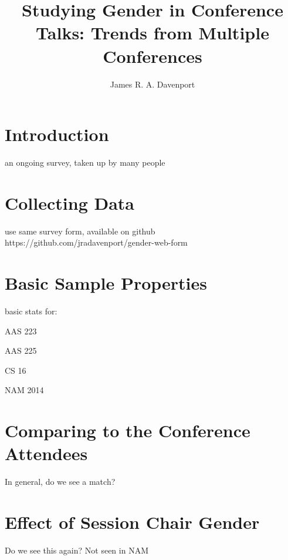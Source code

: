 \documentclass[iop]{emulateapj}
\begin{document}
\title{Studying Gender in Conference Talks: Trends from Multiple Conferences}

\author{
	James R. A. Davenport
	}





\begin{abstract}

\end{abstract}



\section{Introduction}

an ongoing survey, taken up by many people


\section{Collecting Data}

use same survey form, available on github
https://github.com/jradavenport/gender-web-form


\section{Basic Sample Properties}
basic stats for:

AAS 223

AAS 225

CS 16

NAM 2014




\section{Comparing to the Conference Attendees} 
In general, do we see a match?


\section{Effect of Session Chair Gender}
Do we see this again? Not seen in NAM
\end{document}
